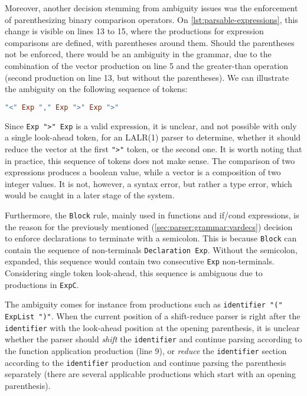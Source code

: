 \par Moreover, another decision stemming from ambiguity issues was the enforcement of parenthesizing binary comparison operators. On \cref{lst:parsable-expressions}, this change is visible on lines 13 to 15, where the productions for expression comparisons are defined, with parentheses around them. Should the parentheses not be enforced, there would be an ambiguity in the grammar, due to the combination of the vector production on line 5 and the greater-than operation (second production on line 13, but without the parentheses). We can illustrate the ambiguity on the following sequence of tokens: 
\begin{lstlisting}[language=haskell, xleftmargin=.3\textwidth, numbers=none, frame=none]
"<" Exp "," Exp ">" Exp ">"
\end{lstlisting}
Since \lstinline{Exp ">" Exp} is a valid expression, it is unclear, and not possible with only a single look-ahead token, for an LALR(1) parser to determine, whether it should reduce the vector at the first \lstinline{">"} token, or the second one. It is worth noting that in practice, this sequence of tokens does not make sense. The comparison of two expressions produces a boolean value, while a vector is a composition of two integer values. It is not, however, a syntax error, but rather a type error, which would be caught in a later stage of the system.

\par Furthermore, the \lstinline{Block} rule, mainly used in functions and if/cond expressions, is the reason for the previously mentioned (\cref{sec:parser:grammar:vardecs}) decision to enforce declarations to terminate with a semicolon. This is because \lstinline{Block} can contain the sequence of non-terminals \lstinline{Declaration Exp}. Without the semicolon, expanded, this sequence would contain two consecutive \lstinline{Exp} non-terminals. Considering single token look-ahead, this sequence is ambiguous due to productions in \lstinline{ExpC}. 
\par The ambiguity comes for instance from productions such as \lstinline{identifier "(" ExpList ")"}. When the current position of a shift-reduce parser is right after the \lstinline{identifier} with the look-ahead position at the opening parenthesis, it is unclear whether the parser should \textit{shift} the \lstinline{identifier} and continue parsing according to the function application production (line 9), or \textit{reduce} the \lstinline{identifier} section according to the \lstinline{identifier} production and continue parsing the parenthesis separately (there are several applicable productions which start with an opening parenthesis). 

